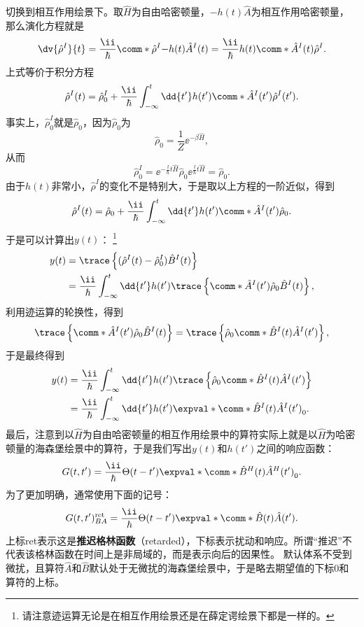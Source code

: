 切换到相互作用绘景下。取$\hat{H}$为自由哈密顿量，$-h(t)\hat{A}$为相互作用哈密顿量，那么演化方程就是
\[
    \dv{\hat{\rho}^I}{t} = \frac{\ii}{\hbar} \comm*{\hat{\rho}^I}{-h(t)\hat{A}^I(t)} = \frac{\ii}{\hbar} h(t) \comm*{\hat{A}^I(t)}{\hat{\rho}^I}.
\]
上式等价于积分方程
\[
    \hat{\rho}^I(t) = \hat{\rho}_0^I + \frac{\ii}{\hbar}  \int_{-\infty}^t \dd{t'} h(t') \comm*{\hat{A}^I(t')}{\hat{\rho}^I(t')}.
\]
事实上，$\hat{\rho}_0^I$就是$\hat{\rho}_0$，因为$\hat{\rho}_0$为
\[
    \hat{\rho}_0 = \frac{1}{Z} \ee^{-\beta \hat{H}},
\]
从而
\[
    \hat{\rho}_0^I = \ee^{-\frac{\ii}{\hbar}t \hat{H}} \hat{\rho}_0 \ee^{\frac{\ii}{\hbar}t \hat{H}} = \hat{\rho}_0.
\]
由于$h(t)$非常小，$\hat{\rho}^I$的变化不是特别大，于是取以上方程的一阶近似，得到
\[
    \hat{\rho}^I(t) = \hat{\rho}_0 + \frac{\ii}{\hbar}  \int_{-\infty}^t \dd{t'} h(t') \comm*{\hat{A}^I(t')}{\hat{\rho}_0}.
\]
于是可以计算出$y(t)$：%
\footnote{请注意迹运算无论是在相互作用绘景还是在薛定谔绘景下都是一样的。}
\[
    \begin{aligned}
        y(t) &= \trace \left\{ (\hat{\rho}^I(t) - \hat{\rho}^I_0) \hat{B}^I(t) \right\} \\
        &= \frac{\ii}{\hbar} \int_{-\infty}^t \dd{t'} h(t') \trace \left\{ \comm*{\hat{A}^I(t')}{\hat{\rho}_0} \hat{B}^I(t) \right\},
    \end{aligned}
\]
利用迹运算的轮换性，得到
\[
    \trace \left\{ \comm*{\hat{A}^I(t')}{\hat{\rho}_0} \hat{B}^I(t) \right\} = \trace \left\{ \hat{\rho}_0 \comm*{\hat{B}^I(t)}{\hat{A}^I(t')} \right\},
\]
于是最终得到
\[
    \begin{aligned}
        y(t) &= \frac{\ii}{\hbar} \int_{-\infty}^t \dd{t'} h(t') \trace \left\{ \hat{\rho}_0 \comm*{\hat{B}^I(t)}{\hat{A}^I(t')} \right\} \\
        &= \frac{\ii}{\hbar} \int_{-\infty}^t \dd{t'} h(t') \expval*{\comm*{\hat{B}^I(t)}{\hat{A}^I(t')} }_0.
    \end{aligned}
\]
最后，注意到以$\hat{H}$为自由哈密顿量的相互作用绘景中的算符实际上就是以$\hat{H}$为哈密顿量的海森堡绘景中的算符，于是我们写出$y(t)$和$h(t')$之间的响应函数：
\[
    G(t,t') = \frac{\ii}{\hbar} \Theta(t-t') \expval*{\comm*{\hat{B}^H(t)}{\hat{A}^H(t')}}_0.
\]
为了更加明确，通常使用下面的记号：
\begin{equation}
    G(t,t')^\text{ret}_{BA} = \frac{\ii}{\hbar} \Theta(t-t') \expval*{\comm*{\hat{B}(t)}{\hat{A}(t')}}.
    \label{eq:retarded-green-function}
\end{equation}
上标ret表示这是\textbf{推迟格林函数}（retarded），下标表示扰动和响应。所谓“推迟”不代表该格林函数在时间上是非局域的，而是表示向后的因果性。
默认体系不受到微扰，且算符$\hat{A}$和$\hat{B}$默认处于无微扰的海森堡绘景中，于是略去期望值的下标0和算符的上标。

